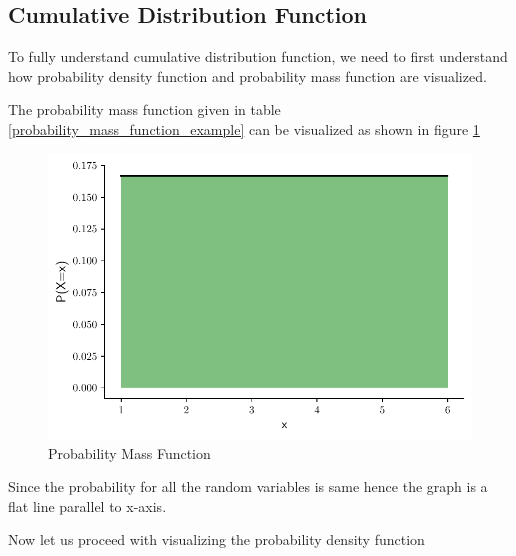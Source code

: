 \documentclass[twoside,12pt]{report}  %
\begin{document}
\subsection{Cumulative Distribution Function}

To fully understand cumulative distribution function, we need to first understand how probability density function and probability mass function are visualized.

\begin{tcolorbox}[colback=blue!5!white, colframe=blue!75!black, title = \textbf{Visualizing Probability Mass Function}]
	The probability mass function given in table \ref{probability_mass_function_example} can be visualized as shown in figure \ref{figure_probabilitymassfunction_example}
	
	\begin{figure}[H]
		\centering
		\includegraphics[width=0.5\linewidth]{./images/probabilitymassfunction_example.pdf}
		\caption{Probability Mass Function}
		\label{figure_probabilitymassfunction_example}
	\end{figure}

	Since the probability for all the random variables is same hence the graph is a flat line parallel to x-axis.
	
\end{tcolorbox}
\vfill
\pagebreak
\noindent
Now let us proceed with visualizing the probability density function
\\
\end{document}
